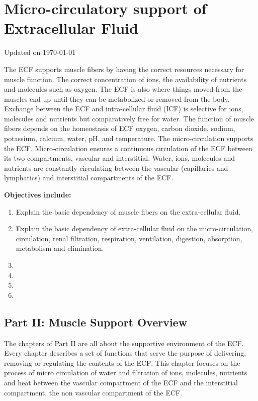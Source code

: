 \chapter{Micro-circulatory support of Extracellular Fluid}\label{chp:ecf_microcirculation}
Updated on \today
\minitoc

The ECF supports muscle fibers by having the correct resources necessary for muscle function. The correct concentration of ions, the availability of nutrients and molecules such as oxygen. The ECF is also where things moved from the muscles end up until they can be metabolized or removed from the body. Exchange between the ECF and intra-cellular fluid (ICF) is selective for ions, molecules and nutrients but comparatively free for water. The function of muscle fibers depends on the homeostasis of ECF oxygen, carbon dioxide, sodium, potassium, calcium, water, pH, and temperature.
The micro-circulation supports the ECF. Micro-circulation ensures a continuous circulation of the ECF between its two compartments, vascular and interstitial. Water, ions, molecules and nutrients are constantly circulating between the vascular (capillaries and lymphatics) and interstitial compartments of the ECF. 

\vspace{5mm}

\textbf{Objectives include:}
\begin{enumerate}
    \item Explain the basic dependency of muscle fibers on the extra-cellular fluid.
    \item Explain the basic dependency of extra-cellular fluid on the micro-circulation, circulation, renal filtration, respiration, ventilation, digestion, absorption, metabolism and elimination.
    \item
    \item
    \item
    \item
\end{enumerate}

\section{Part II: Muscle Support Overview}

The chapters of Part II are all about the supportive environment of the ECF. Every chapter describes a set of functions that serve the purpose of delivering, removing or regulating the contents of the ECF. This chapter focuses on the process of micro circulation of water and filtration of ions, molecules, nutrients and heat between the  vascular compartment of the ECF and the interstitial compartment, the non vascular compartment of the ECF.  

